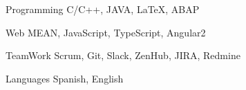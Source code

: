 


\begin{cvskills}


\cvskill
{Programming} %
{C/C++, JAVA, \LaTeX{}, ABAP} %


\cvskill
{Web} %
{MEAN, JavaScript, TypeScript, Angular2} %

\cvskill
{TeamWork} %
{Scrum, Git, Slack, ZenHub, JIRA, Redmine} %

\cvskill
{Languages} %
{Spanish, English} %


\end{cvskills}
